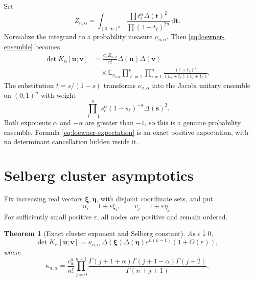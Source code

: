 \documentclass[11pt,oneside]{article}
\newtheorem{theorem}{Theorem}[section]
\theoremstyle{definition}
\theoremstyle{remark}
\newcommand{\E}{\mathbb{E}}
\newcommand{\dd}{\,\mathrm{d}}
\newcommand{\eps}{\varepsilon}
\newcommand{\vander}{\Delta}
\begin{document}
Set
\begin{equation}
 Z_{n,\alpha}
 =\int_{(0,\infty)^n}
 \frac{\prod t_\ell^\alpha\vander(\bm t)^2}
      {\prod(1+t_\ell)^{2n}}\dd\bm t.
 \label{eq:Znalpha}
\end{equation}
Normalize the integrand to a probability measure $\nu_{n,\alpha}$.  Then \eqref{eq:loewner-ensemble} becomes
\begin{align}
 \det K_\alpha[\bm u;\bm v]
 &=\frac{c_\alpha^nZ_{n,\alpha}}{n!}
 \vander(\bm u)\vander(\bm v)\\
 &\quad\times
 \E_{\nu_{n,\alpha}}
 \prod_{\ell=1}^n\prod_{i=1}^n
 \frac{(1+t_\ell)^2}{(u_i+t_\ell)(v_i+t_\ell)}.
 \label{eq:loewner-expectation}
\end{align}
The substitution $t=s/(1-s)$ transforms $\nu_{n,\alpha}$ into the Jacobi unitary ensemble on $(0,1)^n$ with weight
\begin{equation}
 \prod_{\ell=1}^n s_\ell^\alpha(1-s_\ell)^{-\alpha}
 \vander(\bm s)^2.
 \label{eq:JUE}
\end{equation}
Both exponents $\alpha$ and $-\alpha$ are greater than $-1$, so this is a genuine probability ensemble.  Formula \eqref{eq:loewner-expectation} is an exact positive expectation, with no determinant cancellation hidden inside it.

\section{Selberg cluster asymptotics}
\label{sec:selberg}

Fix increasing real vectors $\bm\xi,\bm\eta$, with disjoint coordinate sets, and put
\[
 u_i=1+\eps\xi_i,
 \qquad
 v_j=1+\eps\eta_j.
\]
For sufficiently small positive $\eps$, all nodes are positive and remain ordered.

\begin{theorem}[Exact cluster exponent and Selberg constant]
\label{thm:loewner-cluster}
As $\eps\downarrow0$,
\begin{equation}
 \det K_\alpha[\bm u;\bm v]
 =\kappa_{n,\alpha}\,
 \vander(\bm\xi)\vander(\bm\eta)
 \eps^{n(n-1)}(1+O(\eps)),
 \label{eq:cluster-asymptotic}
\end{equation}
where
\begin{equation}
 \boxed{
 \kappa_{n,\alpha}
 =\frac{c_\alpha^n}{n!}
 \prod_{j=0}^{n-1}
 \frac{\Gamma(j+1+\alpha)\Gamma(j+1-\alpha)\Gamma(j+2)}
      {\Gamma(n+j+1)}.}
 \label{eq:kappa}
\end{equation}
\end{theorem}
\end{document}
